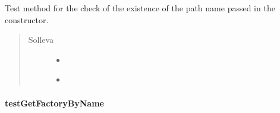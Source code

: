 \documentclass[letterpaper,10pt,italian]{sphinxmanual}
\begin{document}
\begin{fulllineitems}
\label{\detokenize{test/it/unicam/cs/pa/mastermind/test/PlayersFactoryRegistry:it.unicam.cs.pa.mastermind.test.PlayersFactoryRegistry.testCheckRightPathName()}}
Test method for the check of the existence of the path name passed in the constructor.
\begin{quote}\begin{description}
\item[{Solleva}] \leavevmode\begin{itemize}
\item {} 
{\hyperref[\detokenize{source/it/unicam/cs/pa/mastermind/players/BadRegistryException:it.unicam.cs.pa.mastermind.players.BadRegistryException}]{}} \textendash{} 

\item {} 
 \textendash{} 

\end{itemize}

\end{description}\end{quote}

\end{fulllineitems}



\paragraph{testGetFactoryByName}
\label{\detokenize{test/it/unicam/cs/pa/mastermind/test/PlayersFactoryRegistry:testgetfactorybyname}}
\end{document}
